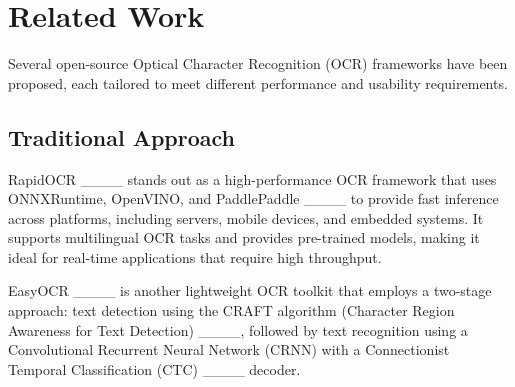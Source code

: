 \section{Related Work}
\label{sec:related_work}

Several open-source Optical Character Recognition (OCR) frameworks have been proposed, each tailored to meet different performance and usability requirements.\\ 

\subsection{Traditional Approach}
\noindent RapidOCR ____ stands out as a high-performance OCR framework that uses ONNXRuntime, OpenVINO, and PaddlePaddle ____ to provide fast inference across platforms, including servers, mobile devices, and embedded systems. It supports multilingual OCR tasks and provides pre-trained models, making it ideal for real-time applications that require high throughput.

\noindent EasyOCR ____ is another lightweight OCR toolkit that employs a two-stage approach: text detection using the CRAFT algorithm (Character Region Awareness for Text Detection) ____, followed by text recognition using a Convolutional Recurrent Neural Network (CRNN) with a Connectionist Temporal Classification (CTC) ____ decoder.